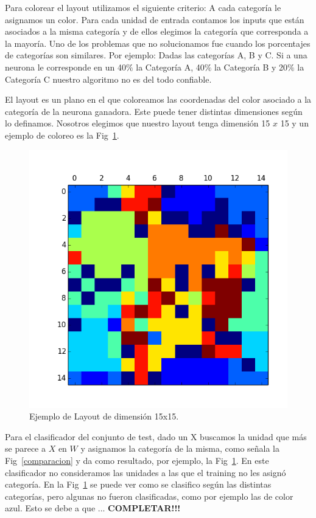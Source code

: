 Para colorear el layout utilizamos el siguiente criterio: A cada categoría le asignamos un color. Para cada unidad de entrada contamos los inputs  que están asociados a la misma categoría y de ellos elegimos la categoría que corresponda a la mayoría. Uno de los problemas que no solucionamos fue cuando los porcentajes de categorías son similares. Por ejemplo: Dadas las categorías A, B y C. Si a una neurona le corresponde en un 40$\%$ la Categoría A, 40$\%$ la Categoría B y 20$\%$ la Categoría C nuestro algoritmo no es del todo confiable.

El layout es un plano en el que coloreamos las coordenadas del color asociado a la categoría de la neurona ganadora. Este puede tener distintas dimensiones según lo definamos. Nosotros elegimos que nuestro layout tenga dimensión 15 $x$ 15 y un ejemplo de coloreo es la Fig~\ref{ejemplo}.

\begin{figure}[ht!]
	\centering
	\includegraphics[width=0.7\linewidth]{img/parte2-ejemplocoloreo.png}
	\caption{Ejemplo de Layout de dimensión 15x15.}
	\label{ejemplo}
\end{figure}

Para el clasificador del conjunto de test, dado un X buscamos la unidad que más se parece a $X$ en $W$ y asignamos la categoría de la misma, como señala la Fig~\ref{comparacion} y da como resultado, por ejemplo, la Fig~\ref{ejemplo}. En este clasificador no consideramos las unidades a las que el training no les asignó categoría. En la Fig~\ref{ejemplo} se puede ver como se clasifico según las distintas categorías, pero algunas no fueron clasificadas, como por ejemplo las de color azul. Esto se debe a que ... \textbf{COMPLETAR!!!}

